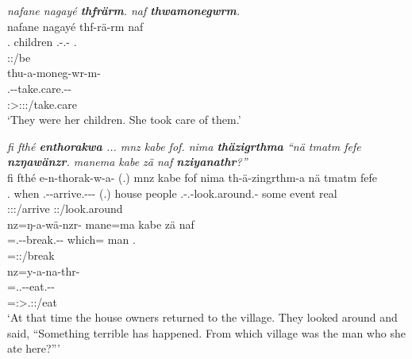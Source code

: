 \begin{exe}
	\ex \textit{nafane nagayé \textbf{thfrärm}. naf \textbf{thwamonegwrm}.}\\
	\glll nafane nagayé thf-rä-rm naf\\
	\Tsg{}.\Poss{} children \Stnsg.\Betatwo-\Cop.\Ndu-\Dur{} \Tsg{}.\Erg{}\\
	{} {} \footnotesize{\Stpl:\Pst:\Dur/be} {}\\
	\sn
	\glll thu-a-moneg-wr-m-\Zero{}\\
	\Stnsg.\Betaone-\Vc-take.care.\Ext-\Ndu-\Dur\\
	\footnotesize{\Stsg:\Sbj>\Stpl:\Obj:\Pst:\Dur/take.care}\\
	\trans `They were her children. She took care of them.'
	\label{ex006}
\end{exe}
\begin{exe}
	\ex \emph{fi fthé \textbf{enthorakwa} ... mnz kabe fof. nima \textbf{thäzigrthma} ``nä tmatm fefe \textbf{nzŋawänzr}. manema kabe zä naf \textbf{nziyanathr}?''}\\
	\glll fi fthé e-n-thorak-w-a-\Zero{} (.) mnz kabe fof nima th-ä-zingrthm-a nä tmatm fefe\\
	\Third{}.\Abs{} when \Stnsg.\Alph-\Venit-arrive.\Ext-\Ndu-\Pst-\Stsg{} (.) house people \Emph{} \Quot{} \Stnsg.\Gam-\Vc.\Ndu-look.around.\Rs-\Pst{} some event real\\
	{} {} \footnotesize{\Stpl:\Pst:\Ipfv:\Venit/arrive} {} {} {} {} {} \footnotesize{\Stpl:\Pst:\Pfv/look.around} {} {} {}\\
	\sn
	\glll nz=ŋ-a-wä-nzr-\Zero{} mane=ma kabe zä naf\\
	\Immpst{}=\M.\Alph-\Vc-break.\Ext-\Ndu-\Stsg{} which=\Char{} man \Prox{} \Tsg{}.\Erg{}\\
	\footnotesize{\Immpst{}=\Stsg:\Nonpast:\Ipfv/break} {} {} {} {}\\
	\sn
	\glll nz=y-a-na-thr-\Zero{}\\
	\Immpst{}=\Tsg.\Masc.\Alph-\Vc-eat.\Ext-\Ndu-\Stsg{}\\
	 \footnotesize{\Immpst{}=\Stsg:\Sbj>\Tsg.\Masc:\Obj:\Nonpast/eat}\\
	\trans `At that time the house owners returned to the village. They looked around and said, ``Something terrible has happened. From which village was the man who she ate here?'''
	\label{ex007}
\end{exe}

